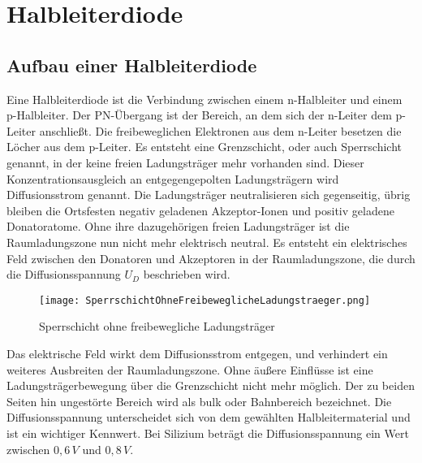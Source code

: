 
\chapter{Halbleiterdiode}
\section{Aufbau einer Halbleiterdiode} \label{sec:Aufbau einer Halbleiter Diode}
Eine Halbleiterdiode ist die Verbindung zwischen einem n-Halbleiter und einem p-Halbleiter. Der PN-Übergang ist der Bereich, an dem sich der n-Leiter dem p-Leiter anschließt. Die freibeweglichen Elektronen aus dem n-Leiter besetzen die Löcher aus dem p-Leiter. Es entsteht eine Grenzschicht, oder auch Sperrschicht genannt, in der keine freien Ladungsträger mehr vorhanden sind.  Dieser Konzentrationsausgleich an entgegengepolten Ladungsträgern wird Diffusionsstrom genannt. Die Ladungsträger neutralisieren sich gegenseitig, übrig bleiben die Ortsfesten negativ geladenen Akzeptor-Ionen und positiv geladene Donatoratome. Ohne ihre dazugehörigen freien Ladungsträger ist die Raumladungszone nun nicht mehr elektrisch neutral. Es entsteht ein elektrisches Feld zwischen den Donatoren und Akzeptoren in der Raumladungszone, die durch die Diffusionsspannung $U_{D}$  beschrieben wird. 

\begin{figure}[!htb]
\centering
\texttt{[image: SperrschichtOhneFreibeweglicheLadungstraeger.png]}
\caption{Sperrschicht ohne freibewegliche Ladungsträger \cite{Stiny2018}}
\end{figure}


Das elektrische Feld wirkt dem Diffusionsstrom entgegen, und verhindert ein weiteres Ausbreiten der Raumladungszone. Ohne äußere Einflüsse ist eine Ladungsträgerbewegung über die Grenzschicht nicht mehr möglich. Der zu beiden Seiten hin ungestörte Bereich wird als bulk oder Bahnbereich bezeichnet. Die Diffusionsspannung unterscheidet sich von dem gewählten Halbleitermaterial und ist ein wichtiger Kennwert. Bei Silizium beträgt die Diffusionsspannung ein Wert zwischen $0,6\,V$ und $0,8\,V$.

